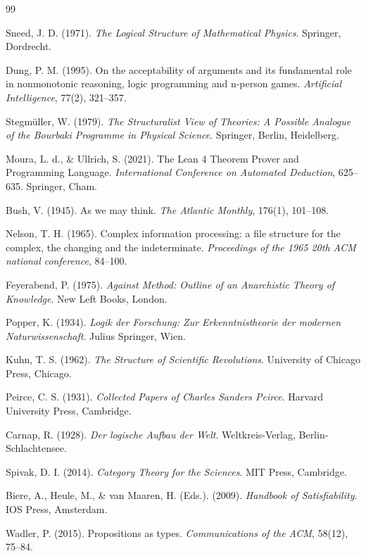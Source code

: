 \documentclass[11pt, a4paper]{article}
\begin{document}
\begin{thebibliography}{99}
	
	Sneed, J. D. (1971). 
	\emph{The Logical Structure of Mathematical Physics}. 
	Springer, Dordrecht.
	
	Dung, P. M. (1995). 
	On the acceptability of arguments and its fundamental role in nonmonotonic reasoning, logic programming and n-person games. 
	\emph{Artificial Intelligence}, 77(2), 321--357.
	
	Stegmüller, W. (1979). 
	\emph{The Structuralist View of Theories: A Possible Analogue of the Bourbaki Programme in Physical Science}. 
	Springer, Berlin, Heidelberg.
	
	Moura, L. d., \& Ullrich, S. (2021). 
	The Lean 4 Theorem Prover and Programming Language. 
	\emph{International Conference on Automated Deduction}, 625--635. Springer, Cham.
	
	Bush, V. (1945). 
	As we may think. 
	\emph{The Atlantic Monthly}, 176(1), 101--108.
	
	Nelson, T. H. (1965). 
	Complex information processing: a file structure for the complex, the changing and the indeterminate. 
	\emph{Proceedings of the 1965 20th ACM national conference}, 84--100.
	
	Feyerabend, P. (1975). 
	\emph{Against Method: Outline of an Anarchistic Theory of Knowledge}. 
	New Left Books, London.
	
	Popper, K. (1934). 
	\emph{Logik der Forschung: Zur Erkenntnistheorie der modernen Naturwissenschaft}. 
	Julius Springer, Wien.
	
	Kuhn, T. S. (1962). 
	\emph{The Structure of Scientific Revolutions}. 
	University of Chicago Press, Chicago.
	
	Peirce, C. S. (1931). 
	\emph{Collected Papers of Charles Sanders Peirce}. 
	Harvard University Press, Cambridge.
	
	Carnap, R. (1928). 
	\emph{Der logische Aufbau der Welt}. 
	Weltkreis-Verlag, Berlin-Schlachtensee.
	
	Spivak, D. I. (2014). 
	\emph{Category Theory for the Sciences}. 
	MIT Press, Cambridge.
	
	Biere, A., Heule, M., \& van Maaren, H. (Eds.). (2009). 
	\emph{Handbook of Satisfiability}. 
	IOS Press, Amsterdam.
	
	Wadler, P. (2015). 
	Propositions as types. 
	\emph{Communications of the ACM}, 58(12), 75--84.
	

\end{thebibliography}
\end{document}
